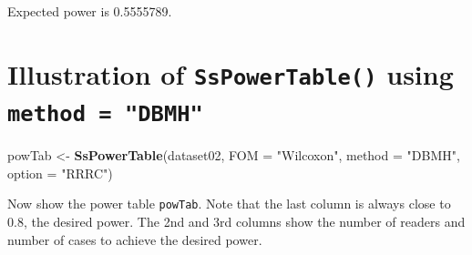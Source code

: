 \documentclass[]{book}
\newenvironment{Shaded}{\begin{snugshade}}{\end{snugshade}}
\newcommand{\CommentTok}[1]{\textcolor[rgb]{0.56,0.35,0.01}{\textit{#1}}}
\newcommand{\DataTypeTok}[1]{\textcolor[rgb]{0.13,0.29,0.53}{#1}}
\newcommand{\KeywordTok}[1]{\textcolor[rgb]{0.13,0.29,0.53}{\textbf{#1}}}
\newcommand{\NormalTok}[1]{#1}
\newcommand{\StringTok}[1]{\textcolor[rgb]{0.31,0.60,0.02}{#1}}
\begin{document}
\begin{Shaded}
\end{Shaded}

Expected power is 0.5555789.

\hypertarget{illustration-of-sspowertable-using-method-dbmh}{%
\section{\texorpdfstring{Illustration of \texttt{SsPowerTable()} using \texttt{method\ =\ "DBMH"}}{Illustration of SsPowerTable() using method = "DBMH"}}\label{illustration-of-sspowertable-using-method-dbmh}}

\begin{Shaded}
\begin{Highlighting}[]
\NormalTok{powTab <-}\StringTok{ }\KeywordTok{SsPowerTable}\NormalTok{(dataset02, }\DataTypeTok{FOM =} \StringTok{"Wilcoxon"}\NormalTok{, }\DataTypeTok{method =} \StringTok{"DBMH"}\NormalTok{, }\DataTypeTok{option =} \StringTok{"RRRC"}\NormalTok{)}
\end{Highlighting}
\end{Shaded}

Now show the power table \texttt{powTab}. Note that the last column is always close to 0.8, the desired power. The 2nd and 3rd columns show the number of readers and number of cases to achieve the desired power.
\end{document}
